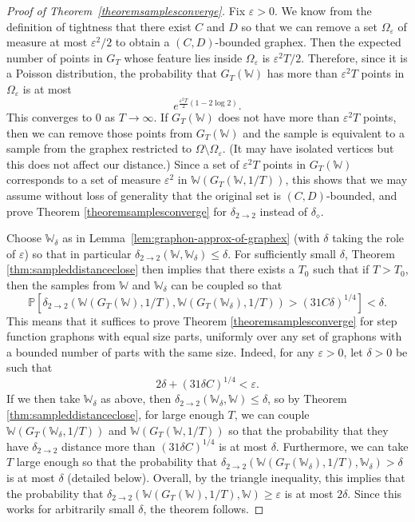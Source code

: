 \documentclass{amsart}
\numberwithin{equation}{section}
\numberwithin{figure}{section}
\theoremstyle{definition}
\theoremstyle{remark}
\newcommand{\PP}{\mathbb{P}}
\newcommand{\cW}{\mathbb{W}}
\newcommand{\deltt}{\delta_{2\to 2}}
\def\delGP{\delta_\diamond}
\begin{document}
\begin{proof}[Proof of Theorem~\ref{theoremsamplesconverge}]
Fix $\varepsilon>0$. We know from the definition of tightness that there
exist $C$ and $D$ so that we can remove a set $\Omega_\varepsilon$ of measure
at most $\varepsilon^2/2$ to obtain a $(C,D)$-bounded graphex. Then the
expected number of points in $G_T$ whose feature lies inside
$\Omega_\varepsilon$ is $\varepsilon^2T/2$. Therefore, since it is a Poisson
distribution, the probability that $G_T(\cW)$ has more than $\varepsilon^2 T$
points in $\Omega_\varepsilon$ is at most
\[ e^{\frac{\varepsilon^2T}{2}(1-2\log 2)}
.\] This converges to $0$ as $T \rightarrow \infty$. If $G_T(\cW)$ does not
have more than $\varepsilon^2 T$ points, then we can remove those points from
$G_T(\cW)$ and the sample is equivalent to a sample from the graphex
restricted to $\Omega \setminus \Omega_\varepsilon$. (It may have isolated
vertices but this does not affect our distance.) Since a set of
$\varepsilon^2 T$ points in $G_T(\cW)$ corresponds to a set of measure
$\varepsilon^2$ in $\cW(G_T(\cW,1/T))$, this shows that we may assume without
loss of generality that the original set is $(C,D)$-bounded, and prove
Theorem \ref{theoremsamplesconverge} for $\deltt$ instead of $\delGP$.

Choose $\cW_\delta$ as in Lemma~\ref{lem:graphon-approx-of-graphex} (with
$\delta$ taking the role of $\varepsilon$) so that in particular
$\deltt(\cW,\cW_\delta) \le \delta$. For sufficiently small $\delta$, Theorem
\ref{thm:sampleddistanceclose} then implies that there exists a $T_0$ such
that if $T>T_0$, then the samples from $\cW$ and $\cW_\delta$ can be coupled
so that
\[\PP[\deltt(\cW(G_T(\cW),1/T),\cW(G_T(\cW_\delta),1/T))> (31C\delta)^{1/4}] < \delta
.\] This means that it suffices to prove Theorem \ref{theoremsamplesconverge}
for step function graphons with equal size parts, uniformly over any set of
graphons with a bounded number of parts with the same size. Indeed, for any
$\varepsilon>0$, let $\delta>0$ be such that
\[2\delta+(31\delta C)^{1/4}<\varepsilon
.\] If we then take $\cW_\delta$ as above, then $\deltt(\cW_\delta,\cW) \le
\delta$, so by Theorem \ref{thm:sampleddistanceclose}, for large enough $T$,
we can couple $\cW(G_T(\cW_\delta,1/T))$ and $\cW(G_T(\cW,1/T))$ so that the
probability that they have $\deltt$ distance more than $(31\delta C)^{1/4}$
is at most $\delta$. Furthermore, we can take $T$ large enough so that the
probability that $\deltt(\cW(G_T(\cW_\delta),1/T),\cW_\delta)>\delta$ is at
most $\delta$ (detailed below). Overall, by the triangle inequality, this
implies that the probability that $\deltt(\cW(G_T(\cW),1/T),\cW) \ge
\varepsilon$ is at most $2\delta$. Since this works for arbitrarily small
$\delta$, the theorem follows.


\end{proof}
\end{document}
